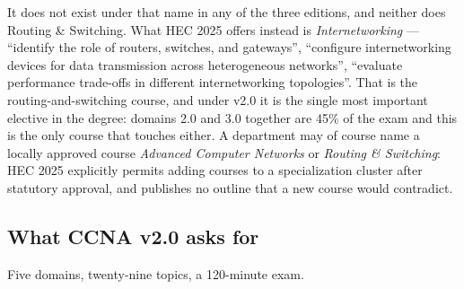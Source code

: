 \documentclass[11pt,a4paper,oneside]{report}
\begin{document}
\begin{finding}
It does not exist under that name in any of the three editions, and neither does
Routing \& Switching. What HEC 2025 offers instead is \emph{Internetworking} ---
``identify the role of routers, switches, and gateways'', ``configure
internetworking devices for data transmission across heterogeneous networks'',
``evaluate performance trade-offs in different internetworking topologies''.
That is the routing-and-switching course, and under v2.0 it is the single most
important elective in the degree: domains 2.0 and 3.0 together are 45\% of the
exam and this is the only course that touches either. A department may of course
name a locally approved course \emph{Advanced Computer Networks} or \emph{Routing
\& Switching}: HEC 2025 explicitly permits adding courses to a specialization
cluster after statutory approval, and publishes no outline that a new course
would contradict.
\end{finding}

\subsection{What CCNA v2.0 asks for}

Five domains, twenty-nine topics, a 120-minute exam.
\end{document}

